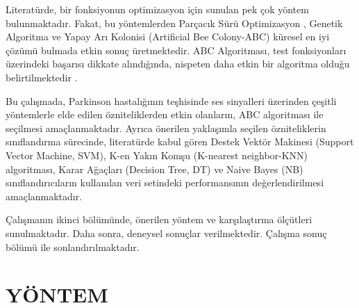 \documentclass[conference]{IEEEtran}
\begin{document}
Literatürde, bir fonksiyonun optimizasyon için sunulan pek çok yöntem bulunmaktadır. Fakat, bu yöntemlerden Parçacık Sürü Optimizasyon \cite{Poli2007}, Genetik Algoritma \cite{holland1989induction} ve Yapay Arı Kolonisi (Artificial Bee Colony-ABC)  \cite{karaboga2005idea} küresel en iyi çözümü bulmada etkin sonuç üretmektedir. ABC Algoritması, test fonksiyonları üzerindeki başarısı dikkate alındığında, nispeten daha etkin bir algoritma olduğu belirtilmektedir \cite{HANCER2018462,BADEM2018826}.

Bu çalışmada, Parkinson hastalığının teşhisinde ses sinyalleri üzerinden çeşitli yöntemlerle elde edilen özniteliklerden etkin olanların, ABC algoritması ile seçilmesi amaçlanmaktadır. Ayrıca önerilen yaklaşımla seçilen özniteliklerin sınıflandırma sürecinde, literatürde kabul gören Destek Vektör Makinesi (Support Vector Machine, SVM), K-en Yakın Komşu (K-nearest neighbor-KNN) algoritması, Karar Ağaçları (Decision Tree, DT) ve Naive Bayes (NB) sınıflandırıcıların kullanılan veri setindeki performansının değerlendirilmesi amaçlanmaktadır. 

Çalışmanın ikinci bölümünde, önerilen yöntem ve karşılaştırma ölçütleri sunulmaktadır. Daha sonra, deneysel sonuçlar verilmektedir. Çalışma sonuç bölümü ile sonlandırılmaktadır.

\section{YÖNTEM}
\end{document}
